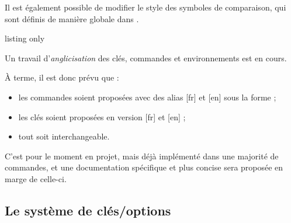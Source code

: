 \begin{tipblock}
Il est également possible de modifier le style des symboles de comparaison, qui sont définis de manière globale dans .
\end{tipblock}

\begin{PresCodeTexPL}{listing only}
\def\pflgeq{\geqslant}%
\def\pflleq{\leqslant}%

\def\pflgeq{\qeq}%
\def\pflleq{\leq}%
\end{PresCodeTexPL}

\begin{noteblock}
Un travail d'\textit{anglicisation} des clés, commandes et environnements est en cours.

À terme, il est donc prévu que :

\begin{itemize}
	\item les commandes soient proposées avec des alias \textsf{[fr]} et \textsf{[en]} sous la forme  ;
	\item les clés soient proposées en version \textsf{[fr]} et \textsf{[en]} ;
	\item tout soit interchangeable.
\end{itemize}

C'est pour le moment en projet, mais déjà implémenté dans une majorité de commandes, et une documentation spécifique et plus concise sera proposée en marge de celle-ci.
\end{noteblock}

\subsection{Le système de \og clés/options \fg}

